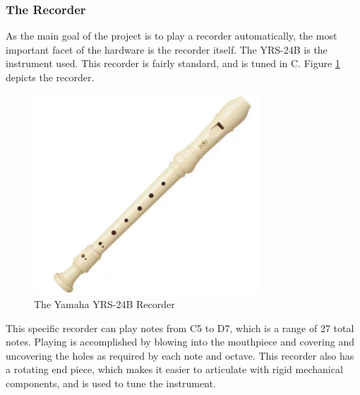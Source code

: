 \documentclass[UTF8, 12pt]{article}
\begin{document}
\subsubsection{The Recorder}
    As the main goal of the project is to play a recorder automatically, the most important facet of the hardware is the recorder itself. The YRS-24B is the instrument used. This recorder is fairly standard, and is tuned in C. Figure \ref{rec} depicts the recorder.
    \begin{figure}[h]
        \centering
        \includegraphics[width=0.75\textwidth]{recorder.png}
        \caption{The Yamaha YRS-24B Recorder}
        \label{rec}
    \end{figure}
    This specific recorder can play notes from C5 to D7, which is a range of 27 total notes. Playing is accomplished by blowing into the mouthpiece and covering and uncovering the holes as required by each note and octave. This recorder also has a rotating end piece, which makes it easier to articulate with rigid mechanical components, and is used to tune the instrument.
    \newpage
\end{document}
